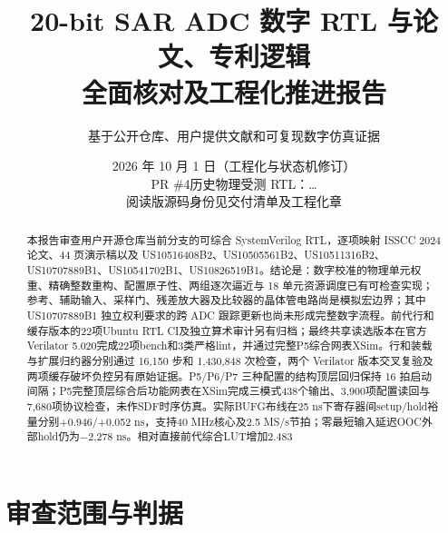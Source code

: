 \documentclass[UTF8,fontset=fandol,11pt,a4paper,openany]{ctexrep}
\title{20-bit SAR ADC 数字 RTL 与论文、专利逻辑\\全面核对及工程化推进报告}
\author{基于公开仓库、用户提供文献和可复现数字仿真证据}
\date{2026 年 10 月 1 日（工程化与状态机修订）\\PR \#4\quad 历史物理受测 RTL：\code{89b9f8153fea}\ldots\\阅读版源码身份见交付清单及工程化章}
\begin{document}
\maketitle
\begin{abstract}
本报告审查用户开源仓库当前分支的可综合 SystemVerilog RTL，逐项映射 ISSCC 2024 论文、44 页演示稿以及 US10516408B2、US10505561B2、US10511316B2、US10707889B1、US10541702B1、US10826519B1。结论是：数字校准的物理单元权重、精确整数重构、配置原子性、两组逐次逼近与 18 单元资源调度已有可检查实现；参考、辅助输入、采样门、残差放大器及比较器的晶体管电路尚是模拟宏边界；其中 US10707889B1 独立权利要求的跨 ADC 跟踪更新也尚未形成完整数字流程。前代行和缓存版本的22项Ubuntu RTL CI及独立算术审计另有归档；最终共享读选版本在官方Verilator 5.020完成22项bench和3类严格lint，并通过完整P5综合网表XSim。行和装载与扩展归约器分别通过 16,150 步和 1,430,848 次检查，两个 Verilator 版本交叉复验及两项缓存破坏负控另有原始证据。P5/P6/P7 三种配置的结构顶层回归保持 16 拍启动间隔；P5完整顶层综合后功能网表在XSim完成三模式438个输出、3,900项配置读回与7,680项协议检查，未作SDF时序仿真。实际BUFG布线在25 ns下寄存器间setup/hold裕量分别+0.946/+0.052 ns，支持40 MHz核心及2.5 MS/s节拍；零最短输入延迟OOC外部hold仍为−2.278 ns。相对直接前代综合LUT增加2.483%
\end{abstract}
\tableofcontents

\chapter{审查范围与判据}
\end{document}
